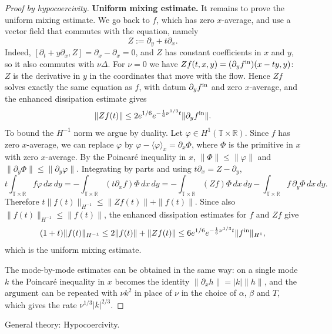 \documentclass[11pt]{article}
\theoremstyle{definition}
\theoremstyle{remark}
\newcommand{\wikilink}[2]{\ifx\relax#2\relax#1\else#2\fi}
\begin{document}
\begin{proof}[Proof by hypocoercivity]
\textbf{Uniform mixing estimate.} It remains to prove the uniform mixing estimate. We go back to $f$, which has zero $x$-average, and use a vector field that commutes with the equation, namely
\[Z:=\partial_y+t\partial_x.\]
Indeed, $[\partial_t+y\partial_x,Z]=\partial_x-\partial_x=0$, and $Z$ has constant coefficients in $x$ and $y$, so it also commutes with $\nu\Delta$. For $\nu=0$ we have $Zf(t,x,y)=(\partial_yf^{\rm in})(x-ty,y)$: $Z$ is the derivative in $y$ in the coordinates that move with the flow. Hence $Zf$ solves exactly the same equation as $f$, with datum $\partial_yf^{\rm in}$ and zero $x$-average, and the enhanced dissipation estimate gives
\[\|Zf(t)\|\leq2e^{1/6}e^{-\frac16\nu^{1/3}t}\|\partial_yf^{\rm in}\|.\]
To bound the $H^{-1}$ norm we argue by duality. Let $\varphi\in H^1(\mathbb{T}\times\mathbb{R})$. Since $f$ has zero $x$-average, we can replace $\varphi$ by $\varphi-\langle\varphi\rangle_x=\partial_x\Phi$, where $\Phi$ is the primitive in $x$ with zero $x$-average. By the Poincaré inequality in $x$, $\|\Phi\|\leq\|\varphi\|$ and $\|\partial_y\Phi\|\leq\|\partial_y\varphi\|$. Integrating by parts and using $t\partial_x=Z-\partial_y$,
\[t\int_{\mathbb{T}\times\mathbb{R}}f\varphi\,dx\,dy=-\int_{\mathbb{T}\times\mathbb{R}}(t\partial_xf)\Phi\,dx\,dy=-\int_{\mathbb{T}\times\mathbb{R}}(Zf)\Phi\,dx\,dy-\int_{\mathbb{T}\times\mathbb{R}}f\,\partial_y\Phi\,dx\,dy.\]
Therefore $t\|f(t)\|_{H^{-1}}\leq\|Zf(t)\|+\|f(t)\|$. Since also $\|f(t)\|_{H^{-1}}\leq\|f(t)\|$, the enhanced dissipation estimates for $f$ and $Zf$ give
\[(1+t)\|f(t)\|_{H^{-1}}\leq2\|f(t)\|+\|Zf(t)\|\leq6e^{1/6}e^{-\frac16\nu^{1/3}t}\|f^{\rm in}\|_{H^1},\]
which is the uniform mixing estimate.

The mode-by-mode estimates can be obtained in the same way: on a single mode $k$ the Poincaré inequality in $x$ becomes the identity $\|\partial_xh\|=|k|\|h\|$, and the argument can be repeated with $\nu k^2$ in place of $\nu$ in the choice of $\alpha$, $\beta$ and $T$, which gives the rate $\nu^{1/3}|k|^{2/3}$.
\end{proof}
General theory: \wikilink{Hypocoercivity}{}.
\end{document}
